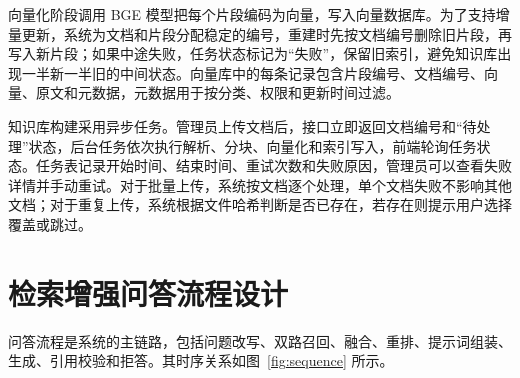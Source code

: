 向量化阶段调用 BGE 模型把每个片段编码为向量，写入向量数据库。为了支持增量更新，系统为文档和片段分配稳定的编号，重建时先按文档编号删除旧片段，再写入新片段；如果中途失败，任务状态标记为“失败”，保留旧索引，避免知识库出现一半新一半旧的中间状态。向量库中的每条记录包含片段编号、文档编号、向量、原文和元数据，元数据用于按分类、权限和更新时间过滤。

知识库构建采用异步任务。管理员上传文档后，接口立即返回文档编号和“待处理”状态，后台任务依次执行解析、分块、向量化和索引写入，前端轮询任务状态。任务表记录开始时间、结束时间、重试次数和失败原因，管理员可以查看失败详情并手动重试。对于批量上传，系统按文档逐个处理，单个文档失败不影响其他文档；对于重复上传，系统根据文件哈希判断是否已存在，若存在则提示用户选择覆盖或跳过。

\section{检索增强问答流程设计}
\label{sec:qa-design}

问答流程是系统的主链路，包括问题改写、双路召回、融合、重排、提示词组装、生成、引用校验和拒答。其时序关系如图~\ref{fig:sequence} 所示。

